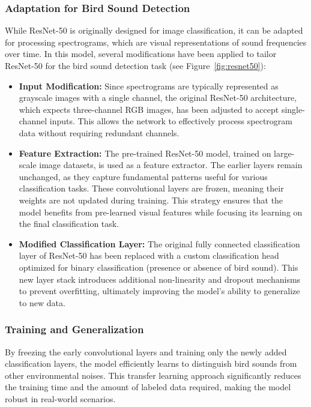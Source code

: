       \subsubsection{Adaptation for Bird Sound Detection}
      While ResNet-50 is originally designed for image classification, it can be adapted for processing spectrograms, which are visual representations of sound frequencies over time. In this model, several modifications have been applied to tailor ResNet-50 for the bird sound detection task (see Figure~\ref{fig:resnet50}):

      \begin{itemize}
            \item \textbf{Input Modification:} Since spectrograms are typically represented as grayscale images with a single channel, the original ResNet-50 architecture, which expects three-channel RGB images, has been adjusted to accept single-channel inputs. This allows the network to effectively process spectrogram data without requiring redundant channels.
      
            \item \textbf{Feature Extraction:} The pre-trained ResNet-50 model, trained on large-scale image datasets, is used as a feature extractor. The earlier layers remain unchanged, as they capture fundamental patterns useful for various classification tasks. These convolutional layers are frozen, meaning their weights are not updated during training. This strategy ensures that the model benefits from pre-learned visual features while focusing its learning on the final classification task.
      
            \item \textbf{Modified Classification Layer:} The original fully connected classification layer of ResNet-50 has been replaced with a custom classification head optimized for binary classification (presence or absence of bird sound). This new layer stack introduces additional non-linearity and dropout mechanisms to prevent overfitting, ultimately improving the model’s ability to generalize to new data.
      
      \end{itemize}

      \subsubsection{Training and Generalization}
      By freezing the early convolutional layers and training only the newly added classification layers, the model efficiently learns to distinguish bird sounds from other environmental noises. This transfer learning approach significantly reduces the training time and the amount of labeled data required, making the model robust in real-world scenarios.


